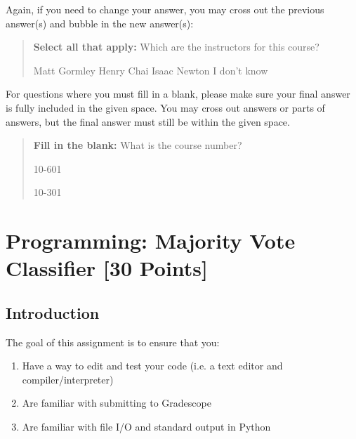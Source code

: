 \documentclass[11pt,addpoints,answers]{exam}
\begin{document}
Again, if you need to change your answer, you may cross out the previous answer(s) and bubble in the new answer(s):

\begin{quote}
\textbf{Select all that apply:} Which are the instructors for this course?
    {%
    \checkboxchar{\xcancel{$\blacksquare$}} \checkedchar{$\blacksquare$} %
    \begin{checkboxes}
    \CorrectChoice Matt Gormley 
    \CorrectChoice Henry Chai
    \choice Isaac Newton
    \choice I don't know
    \end{checkboxes}
    }
\end{quote}

For questions where you must fill in a blank, please make sure your final answer is fully included in the given space. You may cross out answers or parts of answers, but the final answer must still be within the given space.

\begin{quote}
\textbf{Fill in the blank:} What is the course number?

\begin{tcolorbox}[fit,height=1cm, width=4cm, blank, borderline={1pt}{-2pt},nobeforeafter]
    \begin{center}\huge10-601\end{center}
    \end{tcolorbox}\hspace{2cm}
    \begin{tcolorbox}[fit,height=1cm, width=4cm, blank, borderline={1pt}{-2pt},nobeforeafter]
    \begin{center}\huge10-301\end{center}
    \end{tcolorbox}
\end{quote}
\clearpage

\section{Programming: Majority Vote Classifier [30 Points]} 

\subsection{Introduction}
The goal of this assignment is to ensure that you:
\begin{enumerate}
    \item Have a way to edit and test your code (i.e. a text editor and compiler/interpreter)
    \item Are familiar with submitting to Gradescope
    \item Are familiar with file I/O and standard output in Python
\end{enumerate}
\end{document}
